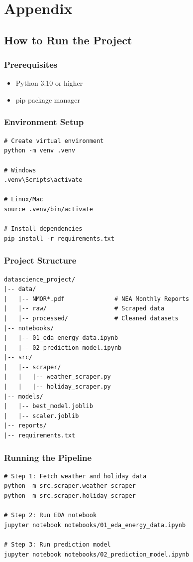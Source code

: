 \large
\begingroup
	\let\clearpage\relax
	\chapter*{Appendix}
\endgroup
\normalsize

\section{How to Run the Project}

\subsection*{Prerequisites}
\begin{itemize}
	\item Python 3.10 or higher
	\item pip package manager
\end{itemize}

\subsection*{Environment Setup}
\begin{verbatim}
# Create virtual environment
python -m venv .venv

# Windows
.venv\Scripts\activate

# Linux/Mac
source .venv/bin/activate

# Install dependencies
pip install -r requirements.txt
\end{verbatim}

\subsection*{Project Structure}
\begin{verbatim}
datascience_project/
|-- data/
|   |-- NMOR*.pdf              # NEA Monthly Reports
|   |-- raw/                   # Scraped data
|   |-- processed/             # Cleaned datasets
|-- notebooks/
|   |-- 01_eda_energy_data.ipynb
|   |-- 02_prediction_model.ipynb
|-- src/
|   |-- scraper/
|   |   |-- weather_scraper.py
|   |   |-- holiday_scraper.py
|-- models/
|   |-- best_model.joblib
|   |-- scaler.joblib
|-- reports/
|-- requirements.txt
\end{verbatim}

\subsection*{Running the Pipeline}
\begin{verbatim}
# Step 1: Fetch weather and holiday data
python -m src.scraper.weather_scraper
python -m src.scraper.holiday_scraper

# Step 2: Run EDA notebook
jupyter notebook notebooks/01_eda_energy_data.ipynb

# Step 3: Run prediction model
jupyter notebook notebooks/02_prediction_model.ipynb
\end{verbatim}

